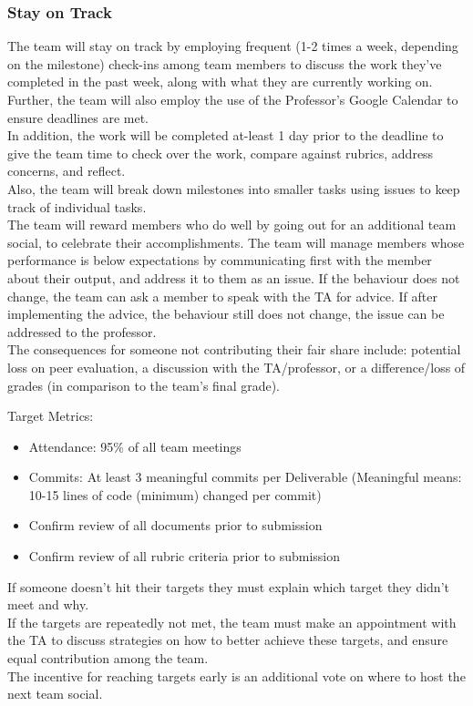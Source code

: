 \documentclass{article}
\begin{document}
\subsubsection*{Stay on Track}

\indent The team will stay on track by employing frequent (1-2 times a week, depending on the milestone)
check-ins among team members to discuss the work they've completed in the past week, along with
what they are currently working on.\\
\indent Further, the team will also employ the use of the Professor's Google Calendar to ensure deadlines are met.\\
\indent In addition, the work will be completed at-least 1 day prior to the deadline to give the team time to check over
the work, compare against rubrics, address concerns, and reflect.\\
\indent Also, the team will break down milestones into smaller tasks using issues to keep track of individual tasks.\\

\indent The team will reward members who do well by going out for an additional team social, to celebrate their accomplishments.
The team will manage members whose performance is below expectations by communicating first with the member
about their output, and address it to them as an issue. If the behaviour does not change, the team can ask a member
to speak with the TA for advice. If after implementing the advice, the behaviour still does not change, the issue can
be addressed to the professor.\\
\indent The consequences for someone not contributing their fair share include: potential loss on peer evaluation, a discussion
with the TA/professor, or a difference/loss of grades (in comparison to the team's final grade).

Target Metrics:
\begin{itemize}
  \item Attendance: 95\% of all team meetings
  \item Commits: At least 3 meaningful commits per Deliverable (Meaningful means: 10-15 lines of code (minimum) changed per commit)
  \item Confirm review of all documents prior to submission
  \item Confirm review of all rubric criteria prior to submission
\end{itemize}

If someone doesn't hit their targets they must explain which target they didn't meet and why.\\
\indent If the targets are repeatedly not met, the team must make an appointment with the TA to discuss strategies on
how to better achieve these targets, and ensure equal contribution among the team.\\
\indent The incentive for reaching targets early is an additional vote on where to host the next team social.\\
\end{document}
